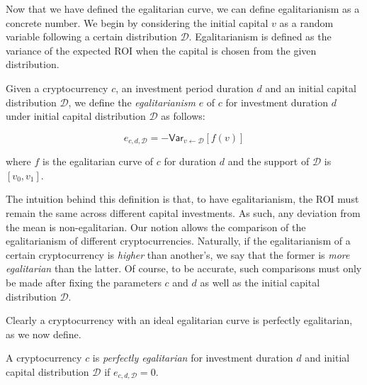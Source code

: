 Now that we have defined the egalitarian curve, we can define egalitarianism
as a concrete number. We begin by considering the initial capital $v$ as a
random variable following a certain distribution $\mathcal{D}$. Egalitarianism
is defined as the variance of the expected ROI when the capital is chosen from
the given distribution.

\begin{definition}[Egalitarianism]
  Given a cryptocurrency $c$, an investment period duration $d$ and an initial
  capital distribution $\mathcal{D}$, we define the \emph{egalitarianism} $e$ of $c$
  for investment duration $d$ under initial capital distribution $\mathcal{D}$
  as follows:

  \[
    e_{c,d,\mathcal{D}} = -\textsf{Var}_{v \gets \mathcal{D}}[f(v)]
  \]

  where $f$ is the egalitarian curve of $c$ for duration $d$ and the support of
  $\mathcal{D}$ is $[v_0, v_1]$.
\end{definition}

The intuition behind this definition is that, to have egalitarianism, the ROI
must remain the same across different capital investments. As such, any
deviation from the mean is non-egalitarian. Our notion allows the comparison of
the egalitarianism of different cryptocurrencies. Naturally, if the
egalitarianism of a certain cryptocurrency is \emph{higher} than another's, we
say that the former is \emph{more egalitarian} than the latter. Of course, to be
accurate, such comparisons must only be made after fixing the parameters $c$
and $d$ as well as the initial capital distribution $\mathcal{D}$.

Clearly a cryptocurrency with an ideal egalitarian curve is perfectly
egalitarian, as we now define.

\begin{definition}
  A cryptocurrency $c$ is \emph{perfectly egalitarian} for investment duration
  $d$ and initial capital distribution $\mathcal{D}$ if
  $e_{c,d,\mathcal{D}} = 0$.
\end{definition}
